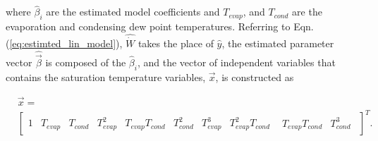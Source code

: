 where $\hat{\beta}_i$ are the estimated model coefficients and $T_{evap}$, and $T_{cond}$ are the evaporation and condensing dew point temperatures. Referring to Eqn. (\ref{eq:estimted_lin_model}), $\hat {\dot W}$ takes the place of $\hat y$, the estimated parameter vector  $\hat {\vec \beta}$ is composed of the $\hat{\beta}_i$, and the vector of independent variables that contains the saturation temperature variables, $\vec x$, is constructed as

\begin{equation}
\begin{split}
&\vec x = \\
&{\left[ {\begin{array}{*{20}{c}}
  1&{{T_{evap}}}&{{T_{cond}}}&{T_{evap}^2}&{{T_{evap}}{T_{cond}}}&{T_{cond}^2}&{T_{evap}^3}&{T_{evap}^2{T_{cond}}}&{\begin{array}{*{20}{c}}
  {{T_{evap}}{T_{cond}}}&{T_{cond}^3}
\end{array}} 
\end{array}} \right]^T}.
\end{split}
\label{eq:lin_reg_temp_vec}
\end{equation}
